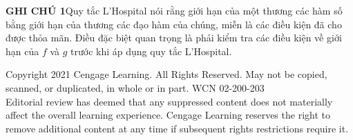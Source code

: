 \begin{minipage}[t]{380pt}
  \vspace{4pt}
  \noindent
  \textbf{\textsf{\textcolor{stewartgreen}{GHI CHÚ 1}}}\enspace Quy tắc L'Hospital nói rằng giới hạn của một thương các hàm số bằng giới hạn của thương các đạo hàm của chúng, miễn là các điều kiện đã cho được thỏa mãn. Điều đặc biệt quan trọng là phải kiểm tra các điều kiện về giới hạn của $f$ và $g$ trước khi áp dụng quy tắc L'Hospital.
\end{minipage}

\vfill
\noindent
\begin{minipage}{\textwidth}
  \centering\fontsize{6.5}{8}\selectfont\textcolor{copyrightgray}{%
  Copyright 2021 Cengage Learning. All Rights Reserved. May not be copied, scanned, or duplicated, in whole or in part. WCN 02-200-203\\
  Editorial review has deemed that any suppressed content does not materially affect the overall learning experience. Cengage Learning reserves the right to remove additional content at any time if subsequent rights restrictions require it.}
\end{minipage}

